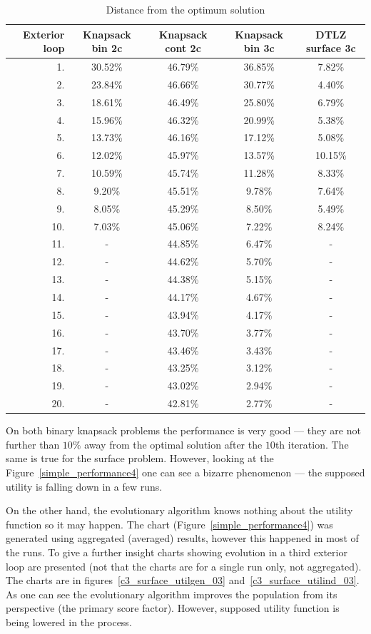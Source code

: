 \begin{table}
  \centering
  \begin{tabular}{r c c c c}
    \hline
    Exterior loop & Knapsack bin 2c & Knapsack cont 2c & Knapsack bin 3c &
    DTLZ surface 3c \\
    \hline
    \hline
    1. & 30.52\% & 46.79\% & 36.85\% & 7.82\% \\
    2. & 23.84\% & 46.66\% & 30.77\% & 4.40\% \\
    3. & 18.61\% & 46.49\% & 25.80\% & 6.79\% \\
    4. & 15.96\% & 46.32\% & 20.99\% & 5.38\% \\
    5. & 13.73\% & 46.16\% & 17.12\% & 5.08\% \\
    6. & 12.02\% & 45.97\% & 13.57\% & 10.15\% \\
    7. & 10.59\% & 45.74\% & 11.28\% & 8.33\% \\
    8. & 9.20\% & 45.51\% & 9.78\% & 7.64\% \\
    9. & 8.05\% & 45.29\% & 8.50\% & 5.49\% \\
    10. & 7.03\% & 45.06\% & 7.22\% & 8.24\% \\
    11. & - & 44.85\% & 6.47\% & - \\
    12. & - & 44.62\% & 5.70\% & - \\
    13. & - & 44.38\% & 5.15\% & - \\
    14. & - & 44.17\% & 4.67\% & - \\
    15. & - & 43.94\% & 4.17\% & - \\
    16. & - & 43.70\% & 3.77\% & - \\
    17. & - & 43.46\% & 3.43\% & - \\
    18. & - & 43.25\% & 3.12\% & - \\
    19. & - & 43.02\% & 2.94\% & - \\
    20. & - & 42.81\% & 2.77\% & - \\
    \hline
  \end{tabular}
  \caption{Distance from the optimum solution}
  \label{t:opt_dist}
\end{table}

On both binary knapsack problems the performance is very good --- they are not
further than $10\%$ away from the optimal solution after the $10$th
iteration. The same is true for the surface problem. However, looking at the
Figure~\ref{simple_performance4} one can see a bizarre phenomenon --- the
supposed utility is falling down in a few runs.

On the other hand, the evolutionary algorithm knows nothing about the utility
function so it may happen. The chart (Figure~\ref{simple_performance4}) was
generated using aggregated (averaged) results, however this happened in most
of the runs. To give a further insight charts showing evolution in a third
exterior loop are presented (not that the charts are for a single run only,
not aggregated). The charts are in figures~\ref{c3_surface_utilgen_03}
and~\ref{c3_surface_utilind_03}. As one can see the evolutionary algorithm
improves the population from its perspective (the primary score factor).
However, supposed utility function is being lowered in the process.

